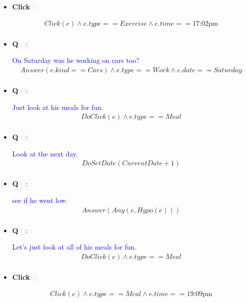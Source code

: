 \documentclass[11pt]{article}
\newcounter{CQ}
\newcounter{CClick}
\newcommand{\key}[1]{\textcolor{lightgray}{#1}}
\begin{document}
\begin{itemize}
	
	\item
	\textbf{Click\theCClick} \key{()} \addtocounter{CClick}{1}
	\begin{multline*}
	Click(e) \wedge e.type == Exercise \wedge e.time == \mbox{17:02pm} \\
	\end{multline*}
	
	
	\item
	\textbf{Q\theCQ} \key{()}: \addtocounter{CQ}{1}
	\textcolor{blue}{ On Saturday was he working on cars too? }
	\begin{multline*}
	 Answer(e.kind == Cars) \wedge e.type == Work \wedge e.date==Saturday \\
	\end{multline*}


	\item
	\textbf{Q\theCQ} \key{()}: \addtocounter{CQ}{1}
	\textcolor{blue}{ Just look at his meals for fun. }
	\begin{multline*}
	DoClick(e) \wedge e.type == Meal \\
	\end{multline*}
	
	
	\item
	\textbf{Q\theCQ} \key{()}: \addtocounter{CQ}{1}
	\textcolor{blue}{ Look at the next day.}
	\begin{multline*}
	DoSetDate(CurrentDate + 1) \\
	\end{multline*}
	
	\item
	\textbf{Q\theCQ} \key{()}: \addtocounter{CQ}{1}
	\textcolor{blue}{ see if he went low. }
	\begin{multline*}
	 Answer(Any(e, Hypo(e)))  \\
	\end{multline*}
	
	
	\item
	\textbf{Q\theCQ} \key{()}: \addtocounter{CQ}{1}
	\textcolor{blue}{ Let's just look at all of his meals for fun. }
	\begin{multline*}
	DoClick(e) \wedge e.type == Meal \\
	\end{multline*}
	
	
	\item
	\textbf{Click\theCClick} \key{()} \addtocounter{CClick}{1}
	\begin{multline*}
	Click(e) \wedge e.type == Meal \wedge e.time == \mbox{19:09pm} \\
	\end{multline*}
	

\end{itemize}
\end{document}
